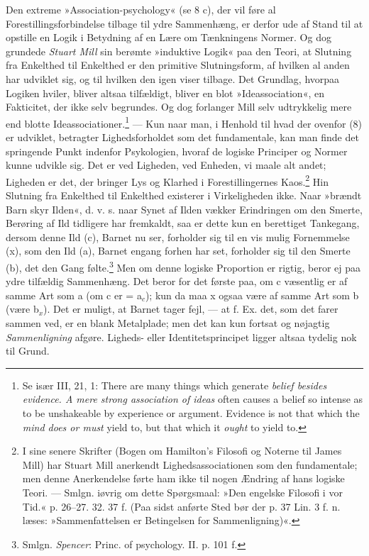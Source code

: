 \documentclass[12pt,a4paper,openany]{book}
\newcommand{\opage}[1]{\marginnote{\footnotesize\textit{[#1]}}}
\begin{document}
Den extreme »Association-psychology« (se 8 c), der vil føre al
Forestillingsforbindelse tilbage til ydre Sammenhæng, er derfor ude af
Stand til at opstille en Logik i Betydning af en Lære om Tænkningens
Normer. Og dog grundede \emph{Stuart Mill} sin berømte »induktive Logik«
paa den Teori, at Slutning fra Enkelthed til Enkelthed er den primitive
Slutningsform,
\opage{213}af hvilken al anden har udviklet sig, og til hvilken den igen
viser tilbage. Det Grundlag, hvorpaa Logiken hviler, bliver altsaa
tilfældigt, bliver en blot »Ideassociation«, en Fakticitet, der ikke
selv begrundes. Og dog forlanger Mill selv udtrykkelig mere end blotte
Ideassociationer.\footnote[1]{Se især III, 21, 1: There are many things which generate \emph{belief besides evidence. A mere strong association of ideas} often causes a belief so intense as to be unshakeable by
experience or argument. Evidence is not that which the \emph{mind does or must} yield to, but that which it \emph{ought} to yield to.} --- Kun naar man, i
Henhold til hvad der ovenfor (8) er udviklet, betragter Lighedsforholdet
som det fundamentale, kan man finde det springende Punkt indenfor
Psykologien, hvoraf de logiske Principer og Normer kunne udvikle sig.
Det er ved Ligheden, ved Enheden, vi maale alt andet; Ligheden er det,
der bringer Lys og Klarhed i Forestillingernes Kaos.\footnote[2]{I sine
senere Skrifter (Bogen om Hamilton’s Filosofi og Noterne til James Mill)
har Stuart Mill anerkendt Lighedsassociationen som den fundamentale; men
denne Anerkendelse førte ham ikke til nogen Ændring af hans logiske
Teori. --- Smlgn. iøvrig om dette Spørgsmaal: »Den engelske Filosofi i
vor Tid.« p. 26--27. 32. 37 f. (Paa sidst anførte Sted bør der p. 37 Lin.
3 f. n. læses: »Sammenfattelsen er Betingelsen for Sammenligning)«.} Hin
Slutning fra Enkelthed til Enkelthed existerer i Virkeligheden ikke.
Naar »brændt Barn skyr Ilden«, d. v. s. naar Synet af Ilden vækker
Erindringen om den Smerte, Berøring af Ild tidligere har fremkaldt, saa
er dette kun en berettiget Tankegang, dersom denne Ild (c), Barnet nu
ser, forholder sig til en vis mulig Fornemmelse (x), som den Ild (a),
Barnet engang forhen har set, forholder sig til den Smerte (b), det den
Gang følte.\footnote[3]{Smlgn. \emph{Spencer}: Princ. of psychology. II. p. 101
f.} Men om denne logiske Proportion er rigtig, beror ej paa ydre
tilfældig Sammenhæng. Det beror for det første paa, om c væsentlig er af
samme Art som a (om c er = a$_{c}$); kun da maa x ogsaa være af samme
Art som b (være b$_{x}$). Det er muligt, at Barnet tager fejl, --- at f.
Ex. det, som det farer sammen ved, er en blank Metalplade; men det kan
kun fortsat og nøjagtig \emph{Sammenligning} afgøre. Ligheds- eller
Identitetsprincipet ligger altsaa tydelig nok til Grund.
\end{document}
